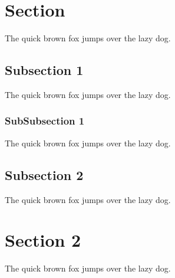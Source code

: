 \documentclass[a4paper, 11pt]{article} %
\makeatletter
\let\oldabstract\abstract
\let\oldendabstract\endabstract
\renewenvironment{abstract}
{\renewenvironment{quotation}%
               {\list{}{\addtolength{\leftmargin}{-9mm} %
                        \listparindent 0em%
                        \itemindent    \listparindent%
                        \rightmargin   \leftmargin%
                        \parsep        \z@ \@plus\p@}%
                \item\relax}%
               {\endlist}%
\oldabstract}
{\oldendabstract}
\makeatother
\begin{document}
\thispagestyle{plain} 
\begin{abstract}

\justify

\lipsum[1]


\end{abstract}


\newpage %

\tableofcontents

\listoffigures

\listoftables

\pagebreak


\section{Section}
The quick brown fox jumps over the lazy dog.

\subsection{Subsection 1}
The quick brown fox jumps over the lazy dog.

\subsubsection{SubSubsection 1}
The quick brown fox jumps over the lazy dog.

\subsection{Subsection 2}
The quick brown fox jumps over the lazy dog.

\section{Section 2}
The quick brown fox jumps over the lazy dog.


\end{document}

